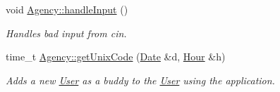 \begin{DoxyCompactItemize}
void \hyperlink{group___agency_gaf0d57adbab935cd35d4e49f29e4abc0c}{Agency\+::handle\+Input} ()
\begin{DoxyCompactList}\small\item\em Handles bad input from cin. \end{DoxyCompactList}\item 
time\+\_\+t \hyperlink{group___agency_ga00fdbd79de096b13dd0033478552164a}{Agency\+::get\+Unix\+Code} (\hyperlink{class_date}{Date} \&d, \hyperlink{class_hour}{Hour} \&h)
\begin{DoxyCompactList}\small\item\em Adds a new \hyperlink{class_user}{User} as a buddy to the \hyperlink{class_user}{User} using the application. \end{DoxyCompactList}\end{DoxyCompactItemize}
